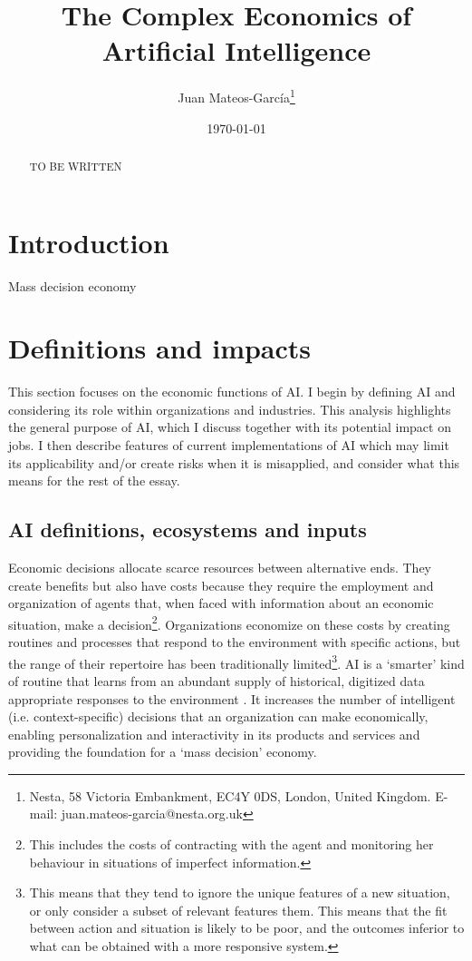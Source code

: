 \documentclass[11pt]{article}
\begin{document}
\begin{titlepage}
\title{The Complex Economics of Artificial Intelligence}
\author{Juan Mateos-Garc\'{i}a\thanks{Nesta, 58 Victoria Embankment, EC4Y 0DS, London, United Kingdom. E-mail: juan.mateos-garcia@nesta.org.uk}}
\date{\today}
\maketitle
\begin{abstract}
\noindent TO BE WRITTEN
\bigskip
\end{abstract}

\setcounter{page}{0}
\thispagestyle{empty}
\end{titlepage}

\section{Introduction}
Mass decision economy

\section{Definitions and impacts}
\label{sec:definition}

This section focuses on the economic functions of AI. I begin by defining AI and considering its role within organizations and industries. This analysis highlights the general purpose of AI, which I discuss together with its potential impact on jobs. I then describe features of current implementations of AI which may limit its applicability and/or create risks when it is misapplied, and consider what this means for the rest of the essay.

\subsection{AI definitions, ecosystems and inputs}
\label{subsec:systems}
Economic decisions allocate scarce resources between alternative ends. They create benefits but also have costs because they require the employment and organization of agents that, when faced with information about an economic situation, make a decision\footnote{This includes the costs of contracting with the agent and monitoring her behaviour in situations of imperfect information.}. Organizations economize on these costs by creating routines and processes that respond to the environment with specific actions, but the range of their repertoire has been traditionally limited\footnote{This means that they tend to ignore the unique features of a new situation, or only consider a subset of relevant features them. This means that the fit between action and situation is likely to be poor, and the outcomes inferior to what can be obtained with a more responsive system.}. AI is a `smarter' kind of routine that learns from an abundant supply of historical, digitized data appropriate responses to the environment . It increases the number of intelligent (i.e. context-specific) decisions that an organization can make economically, enabling personalization and interactivity in its products and services and providing the foundation for a `mass decision' economy.
\end{document}
